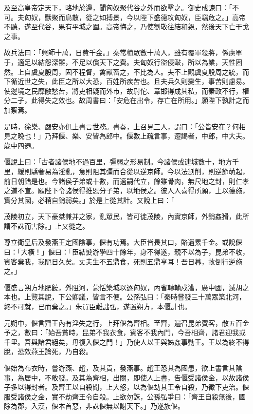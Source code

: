 \begin{pinyinscope}
及至高皇帝定天下，略地於邊，聞匈奴聚代谷之外而欲擊之。御史成諫曰：「不可。夫匈奴，獸聚而鳥散，從之如搏景，今以陛下盛德攻匈奴，臣竊危之。」高帝不聽，遂至代谷，果有平城之圍。高帝悔之，乃使劉敬往結和親，然後天下亡干戈之事。

故兵法曰：「興師十萬，日費千金。」秦常積眾數十萬人，雖有覆軍殺將，係虜單于，適足以結怨深讎，不足以償天下之費。夫匈奴行盜侵敺，所以為業，天性固然。上自虞夏殷周，固不程督，禽獸畜之，不比為人。夫不上觀虞夏殷周之統，而下循近世之失，此臣之所以大恐，百姓所疾苦也。且夫兵久則變生，事苦則慮易。使邊境之民靡敝愁苦，將吏相疑而外市，故尉佗、章邯得成其私，而秦政不行，權分二子，此得失之效也。故周書曰：「安危在出令，存亡在所用。」願陛下孰計之而加察焉。

是時，徐樂、嚴安亦俱上書言世務。書奏，上召見三人，謂曰：「公皆安在？何相見之晚也！」乃拜偃、樂、安皆為郎中。偃數上疏言事，遷謁者，中郎，中大夫。歲中四遷。

偃說上曰：「古者諸侯地不過百里，彊弱之形易制。今諸侯或連城數十，地方千里，緩則驕奢易為淫亂，急則阻其彊而合從以逆京師。今以法割削，則逆節萌起，前日朝錯是也。今諸侯子弟或十數，而適嗣代立，餘雖骨肉，無尺地之封，則仁孝之道不宣。願陛下令諸侯得推恩分子弟，以地侯之。彼人人喜得所願，上以德施，實分其國，必稍自銷弱矣。」於是上從其計。又說上曰：「

茂陵初立，天下豪桀兼并之家，亂眾民，皆可徙茂陵，內實京師，外銷姦猾，此所謂不誅而害除。」上又從之。

尊立衛皇后及發燕王定國陰事，偃有功焉。大臣皆畏其口，賂遺累千金。或說偃曰：「大橫！」偃曰：「臣結髮游學四十餘年，身不得遂，親不以為子，昆弟不收，賓客棄我，我阨日久矣。丈夫生不五鼎食，死則五鼎亨耳！吾日暮，故倒行逆施之。」

偃盛言朔方地肥饒，外阻河，蒙恬築城以逐匈奴，內省轉輸戍漕，廣中國，滅胡之本也。上覽其說，下公卿議，皆言不便。公孫弘曰：「秦時嘗發三十萬眾築北河，終不可就，已而棄之。」朱買臣難詘弘，遂置朔方，本偃計也。

元朔中，偃言齊王內有淫失之行，上拜偃為齊相。至齊，遍召昆弟賓客，散五百金予之，數曰：「始吾貧時，昆弟不我衣食，賓客不我內門，今吾相齊，諸君迎我或千里。吾與諸君絕矣，毋復入偃之門！」乃使人以王與姊姦事動王。王以為終不得脫，恐效燕王論死，乃自殺。

偃始為布衣時，嘗游燕、趙，及其貴，發燕事。趙王恐其為國患，欲上書言其陰事，為居中，不敢發。及其為齊相，出關，即使人上書，告偃受諸侯金，以故諸侯子多以得封者。及齊王以自殺聞，上大怒，以為偃劫其王令自殺，乃徵下吏治。偃服受諸侯之金，實不劫齊王令自殺。上欲勿誅，公孫弘爭曰：「齊王自殺無後，國除為郡，入漢，偃本首惡，非誅偃無以謝天下。」乃遂族偃。


\end{pinyinscope}
